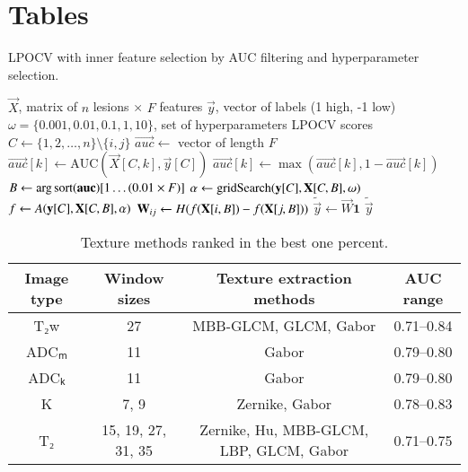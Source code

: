 \section{Tables}

\newcommand{\ci}[1]{{\small (#1)}}  %

\begin{algorithm}[ht]
  \caption{LPOCV with inner feature selection by AUC filtering and
  hyperparameter selection.}
  \label{alg:pseudocode}

  \begin{algorithmic}
    \REQUIRE $\vec{X}$, matrix of $n$ lesions × $F$ features
    \REQUIRE $\vec{y}$, vector of labels (1 high, -1 low)
    \REQUIRE $\omega = \{0.001, 0.01, 0.1, 1, 10\}$, set of hyperparameters
    \ENSURE LPOCV scores
      \STATE $C \gets \{1,2,\dotsc,n\} \setminus \{i,j\}$  
      \STATE $\vec{auc} \gets$ vector of length $F$
        \STATE $\vec{auc}[k] \gets \mathrm{AUC}(\vec{X}[C,k], \vec{y}[C])$  
        \STATE $\vec{auc}[k] \gets \max(\vec{auc}[k], 1-\vec{auc}[k])$  
      \ENDFOR
    \STATE $B \gets \arg\mathrm{sort}(\mathbf{auc})[1 \dotso (0.01 \times F)]$  
    \STATE $\alpha \gets \mathrm{gridSearch}(\mathbf{y}[C], \mathbf{X}[C,B], \omega)$  
    \STATE $f \gets A(\mathbf{y}[C], \mathbf{X}[C,B], \alpha)$  
    \STATE $\mathbf{W}_{ij} \gets H(f(\mathbf{X}[i,B]) - f(\mathbf{X}[j,B]))$  
    \ENDFOR
    \STATE $\tilde{\vec{y}} \gets \vec{W} \textbf{1}$  
    \RETURN $\tilde{\vec{y}}$  
  \end{algorithmic}
\end{algorithm}


\begin{table}[ht]
  \caption{Texture methods ranked in the best one percent.}
  \label{tab:texture_best1p}

  \begin{tabular}{c c c c}
  \hline
  Image type & Window sizes & Texture extraction methods & AUC range \\
  \hline
  T₂w & 27 & MBB-GLCM, GLCM, Gabor & 0.71--0.84 \\
  ADCₘ & 11 & Gabor & 0.79--0.80 \\
  ADCₖ & 11 & Gabor & 0.79--0.80 \\
  K & 7, 9 & Zernike, Gabor & 0.78--0.83 \\
  T₂ & 15, 19, 27, 31, 35 & Zernike, Hu, MBB-GLCM, LBP, GLCM, Gabor & 0.71--0.75 \\
  \hline
  \end{tabular}
\end{table}


